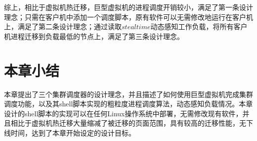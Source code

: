 综上，相比于虚拟机热迁移，巨型虚拟机的进程调度开销较小，满足了第一条设计理念；只需在客户机中添加一个调度脚本，原有软件可以无需修改地运行在客户机上，满足了第二条设计理念；通过读取$steal time$动态感知工作负载，将所有客户机进程迁移到负载最低的节点上，满足了第三条设计理念。

\section{本章小结}
本章提出了三个集群调度器的设计理念，并且描述了如何使用巨型虚拟机完成集群调度功能，以及其shell脚本实现的粗粒度进程调度算法，动态感知负载情况。本章设计的shell脚本的实现可以在任何Linux操作系统中部署，无需修改现有软件，并且相比于虚拟机热迁移大量缩减了被迁移的页面范围，具有较高的迁移性能，无下线时间，达到了本章开始设定的设计目标。